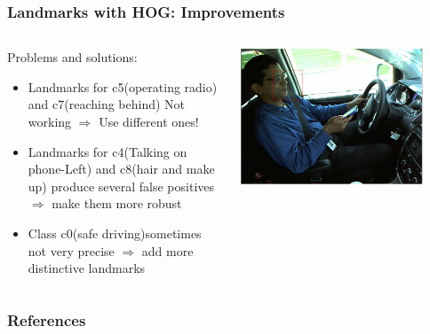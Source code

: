 \documentclass{beamer}
\begin{document}
	\begin{frame}
		\frametitle{Landmarks with HOG: Improvements}		
		\begin{columns}
			\begin{column}{0.5\textwidth}
				Problems and solutions:
				\begin{itemize}
					\item Landmarks for c5(operating radio) and c7(reaching behind) Not working $\Rightarrow$ Use different ones!
					\item Landmarks for c4(Talking on phone-Left) and c8(hair and make up) produce several false positives $\Rightarrow$ make them more robust
					\item Class c0(safe driving)sometimes not very precise $\Rightarrow$ add more distinctive landmarks
				\end{itemize}
			\end{column}
			\begin{column}{0.5\textwidth}
				\begin{center}
					\includegraphics[width=0.85\textwidth]{mult_HOG/talk_phone_left}
				\end{center}
			\end{column}
		\end{columns}
		
	\end{frame}

    
	\begin{frame}[allowframebreaks]
		\frametitle{References} 
		\nocite{*} 
		 
		 
	\end{frame}

	\medskip
\end{document}
